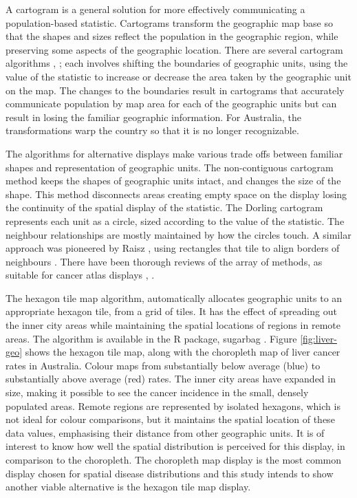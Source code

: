 \documentclass{monashthesis}
\begin{document}
A cartogram is a general solution for more effectively communicating a population-based statistic. Cartograms transform the geographic map base so that the shapes and sizes reflect the population in the geographic region, while preserving some aspects of the geographic location. There are several cartogram algorithms \autocite{ACTUC}, \autocite{CBATCC}; each involves shifting the boundaries of geographic units, using the value of the statistic to increase or decrease the area taken by the geographic unit on the map. The changes to the boundaries result in cartograms that accurately communicate population by map area for each of the geographic units but can result in losing the familiar geographic information. For Australia, the transformations warp the country so that it is no longer recognizable.

The algorithms for alternative displays make various trade offs between familiar shapes and representation of geographic units. The non-contiguous cartogram method \autocite{NAC} keeps the shapes of geographic units intact, and changes the size of the shape. This method disconnects areas creating empty space on the display losing the continuity of the spatial display of the statistic. The Dorling cartogram \autocite{ACTUC} represents each unit as a circle, sized according to the value of the statistic. The neighbour relationships are mostly maintained by how the circles touch. A similar approach was pioneered by Raisz \autocite*{RSCW}, using rectangles that tile to align borders of neighbours \autocite{CDWCS}. There have been thorough reviews of the array of methods, as suitable for cancer atlas displays \autocite{review}, \autocite{BCM}.

The hexagon tile map algorithm, automatically allocates geographic units to an appropriate hexagon tile, from a grid of tiles. It has the effect of spreading out the inner city areas while maintaining the spatial locations of regions in remote areas. The algorithm is available in the R package, sugarbag \autocite{sugarbag}. Figure \ref{fig:liver-geo} shows the hexagon tile map, along with the choropleth map of liver cancer rates in Australia. Colour maps from substantially below average (blue) to substantially above average (red) rates. The inner city areas have expanded in size, making it possible to see the cancer incidence in the small, densely populated areas. Remote regions are represented by isolated hexagons, which is not ideal for colour comparisons, but it maintains the spatial location of these data values, emphasising their distance from other geographic units. It is of interest to know how well the spatial distribution is perceived for this display, in comparison to the choropleth. The choropleth map display is the most common display chosen for spatial disease distributions and this study intends to show another viable alternative is the hexagon tile map display.
\end{document}
